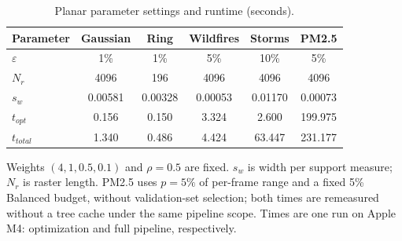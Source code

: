 \begin{table}[!tb]
\centering
\caption{Planar parameter settings and runtime (seconds).}
\label{tab:anchor-parameters-final}
\footnotesize
\setlength{\tabcolsep}{2pt}
\renewcommand{\arraystretch}{0.95}
\begin{tabular}{@{}lccccc@{}}
\toprule
Parameter & Gaussian & Ring & Wildfires & Storms & PM2.5 \\
\midrule
$\varepsilon$ & 1\% & 1\% & 5\% & 10\% & 5\% \\
$N_r$ & 4096 & 196 & 4096 & 4096 & 4096 \\
$s_w$ & 0.00581 & 0.00328 & 0.00053 & 0.01170 & 0.00073 \\
$t_{opt}$ & 0.156 & 0.150 & 3.324 & 2.600 & 199.975 \\
$t_{total}$ & 1.340 & 0.486 & 4.424 & 63.447 & 231.177 \\
\bottomrule
\end{tabular}
\vspace{2pt}
\begin{minipage}{0.94\columnwidth}\footnotesize Weights $(4,1,0.5,0.1)$ and $\rho=0.5$ are fixed. $s_w$ is width per support measure; $N_r$ is raster length. PM2.5 uses $p=5\%$ of per-frame range and a fixed 5\% Balanced budget, without validation-set selection; both times are remeasured without a tree cache under the same pipeline scope. Times are one run on Apple M4: optimization and full pipeline, respectively.\end{minipage}
\end{table}
